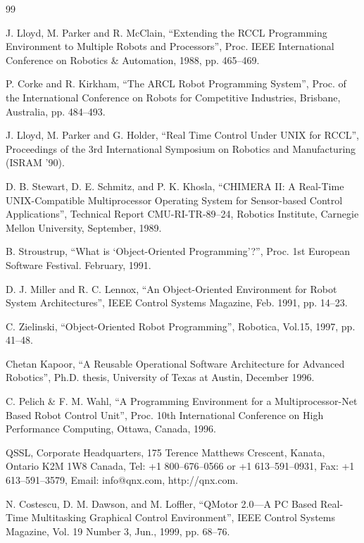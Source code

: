 \documentclass[UTF8,a4paper,12pt]{ctexart}
\begin{document}
\begin{thebibliography}{99}

 J. Lloyd, M. Parker and R. McClain, ``Extending the RCCL Programming Environment to Multiple Robots and Processors'', Proc. IEEE International Conference on Robotics \& Automation, 1988, pp. 465--469.

 P. Corke and R. Kirkham, ``The ARCL Robot Programming System'', Proc. of the International Conference on Robots for Competitive Industries, Brisbane, Australia, pp. 484--493.

 J. Lloyd, M. Parker and G. Holder, ``Real Time Control Under UNIX for RCCL'', Proceedings of the 3rd International Symposium on Robotics and Manufacturing (ISRAM '90).

 D. B. Stewart, D. E. Schmitz, and P. K. Khosla, ``CHIMERA II: A Real-Time UNIX-Compatible Multiprocessor Operating System for Sensor-based Control Applications'', Technical Report CMU-RI-TR-89--24, Robotics Institute, Carnegie Mellon University, September, 1989.

 B. Stroustrup, ``What is `Object-Oriented Programming'?'', Proc. 1st European Software Festival. February, 1991.

 D. J. Miller and R. C. Lennox, ``An Object-Oriented Environment for Robot System Architectures'', IEEE Control Systems Magazine, Feb. 1991, pp. 14--23.

 C. Zielinski, ``Object-Oriented Robot Programming'', Robotica, Vol.15, 1997, pp. 41--48.

 Chetan Kapoor, ``A Reusable Operational Software Architecture for Advanced Robotics'', Ph.D. thesis, University of Texas at Austin, December 1996.

 C. Pelich \& F. M. Wahl, ``A Programming Environment for a Multiprocessor-Net Based Robot Control Unit'', Proc. 10th International Conference on High Performance Computing, Ottawa, Canada, 1996.

 QSSL, Corporate Headquarters, 175 Terence Matthews Crescent, Kanata, Ontario K2M 1W8 Canada, Tel: +1 800--676--0566 or +1 613--591--0931, Fax: +1 613--591--3579, Email: info@qnx.com, http://qnx.com.

 N. Costescu, D. M. Dawson, and M. Loffler, ``QMotor 2.0---A PC Based Real-Time Multitasking Graphical Control Environment'', IEEE Control Systems Magazine, Vol. 19 Number 3, Jun., 1999, pp. 68--76.


\end{thebibliography}
\end{document}
